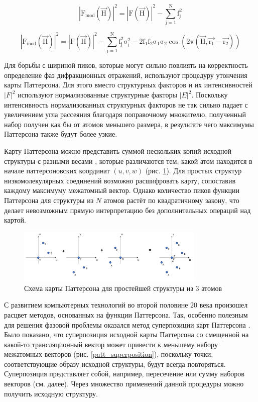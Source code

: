 \begin{equation}\label{patt_mod_1}
	\mathrm{|F_{mod}(\overrightarrow{H})|^2 = |F(\overrightarrow{H})|^2 - \sum\limits_{j=1}^Nf_j^2}
\end{equation}

\begin{equation}\label{patt_mod_2}
	\mathrm{|F_{mod}(\overrightarrow{H})|^2 = |F(\overrightarrow{H})|^2 - \sum\limits_{j=1}^Nf_j^2\sigma_j^2-2f_1f_2\sigma_1\sigma_2\cos(2\pi (\overrightarrow{H},\overrightarrow{r_1}-\overrightarrow{r_2}))}
\end{equation}

Для борьбы с шириной пиков, которые могут сильно повлиять на корректность определение фаз дифракционных отражений, используют процедуру утончения карты Паттерсона. Для этого вместо структурных факторов и их интенсивностей $|F|^2$ используют нормализованные структурные факторы $|E|^2$. Поскольку интенсивность нормализованных структурных факторов не так сильно падает с увеличением угла рассеяния благодаря поправочному множителю, полученный набор получен как бы от атомов меньшего размера, в результате чего максимумы Паттерсона также будут более узкие.

Карту Паттерсона можно представить суммой нескольких копий исходной структуры с разными весами \cite{buerger_solution_1953}, которые различаются тем, какой атом находится в начале паттерсоновских координат $(u, v, w)$ (рис. \ref{patterson_image}). Для простых структур низкомолекулярных соединений возможно расшифровать карту, сопоставив каждому максимуму межатомный вектор. Однако количество пиков функции Паттерсона для структуры из $N$ атомов растёт по квадратичному закону, что делает невозможным прямую интерпретацию без дополнительных операций над картой.

\begin{figure}[H]
	\centering
	\includegraphics[width=0.8\textwidth]{figures/patterson.png}\hfill
	\caption{Схема карты Паттерсона для простейшей структуры из 3 атомов}
	\label{patterson_image}
\end{figure}

С развитием компьютерных технологий во второй половине 20 века произошел расцвет методов, основанных на функции Паттерсона. Так, особенно полезным для решения фазовой проблемы оказался метод суперпозиции карт Паттерсона \cite{hendrixson_locating_1997}. Было показано, что суперпозиция исходной карты Паттерсона со смещенной на какой-то трансляционный вектор может привести к меньшему набору межатомных векторов (рис. \ref{patt_superposition}), поскольку точки, соответствующие образу исходной структуры, будут всегда повторяться. Суперпозиция представляет собой, например, пересечение или сумму наборов векторов (см. далее). Через множество применений данной процедуры можно получить исходную структуру.


